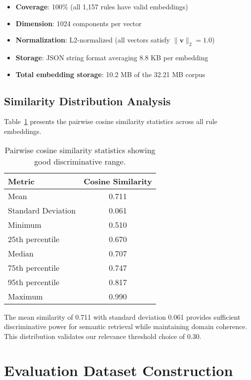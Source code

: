 \begin{itemize}[leftmargin=*,itemsep=2pt,topsep=2pt]
 \item \textbf{Coverage}: 100\% (all 1,157 rules have valid embeddings)
 \item \textbf{Dimension}: 1024 components per vector
 \item \textbf{Normalization}: L2-normalized (all vectors satisfy $\|\mathbf{v}\|_2 = 1.0$)
 \item \textbf{Storage}: JSON string format averaging 8.8 KB per embedding
 \item \textbf{Total embedding storage}: 10.2 MB of the 32.21 MB corpus
\end{itemize}

\subsection{Similarity Distribution Analysis}

Table~\ref{tab:similarity-stats} presents the pairwise cosine similarity statistics across all rule embeddings.

\begin{table}[h]
\centering
\begin{tabular}{lc}
\toprule
\textbf{Metric} & \textbf{Cosine Similarity} \\
\midrule
Mean & 0.711 \\
Standard Deviation & 0.061 \\
Minimum & 0.510 \\
25th percentile & 0.670 \\
Median & 0.707 \\
75th percentile & 0.747 \\
95th percentile & 0.817 \\
Maximum & 0.990 \\
\bottomrule
\end{tabular}
\caption{Pairwise cosine similarity statistics showing good discriminative range.}
\label{tab:similarity-stats}
\end{table}

The mean similarity of 0.711 with standard deviation 0.061 provides sufficient discriminative power for semantic retrieval while maintaining domain coherence. This distribution validates our relevance threshold choice of 0.30.

\section{Evaluation Dataset Construction}

